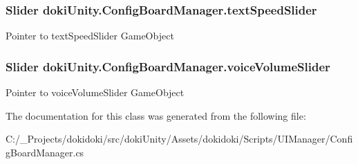 \subsubsection[{\texorpdfstring{text\+Speed\+Slider}{textSpeedSlider}}]{\setlength{\rightskip}{0pt plus 5cm}Slider doki\+Unity.\+Config\+Board\+Manager.\+text\+Speed\+Slider}\hypertarget{classdoki_unity_1_1_config_board_manager_ae5a2ec891003c249e62dcd5113006d11}{}\label{classdoki_unity_1_1_config_board_manager_ae5a2ec891003c249e62dcd5113006d11}


Pointer to text\+Speed\+Slider Game\+Object 

\subsubsection[{\texorpdfstring{voice\+Volume\+Slider}{voiceVolumeSlider}}]{\setlength{\rightskip}{0pt plus 5cm}Slider doki\+Unity.\+Config\+Board\+Manager.\+voice\+Volume\+Slider}\hypertarget{classdoki_unity_1_1_config_board_manager_a303238a10ef64d16327d3dfefbfe021f}{}\label{classdoki_unity_1_1_config_board_manager_a303238a10ef64d16327d3dfefbfe021f}


Pointer to voice\+Volume\+Slider Game\+Object 



The documentation for this class was generated from the following file\+:\begin{DoxyCompactItemize}
\item 
C\+:/\+\_\+\+Projects/dokidoki/src/doki\+Unity/\+Assets/dokidoki/\+Scripts/\+U\+I\+Manager/Config\+Board\+Manager.\+cs\end{DoxyCompactItemize}
